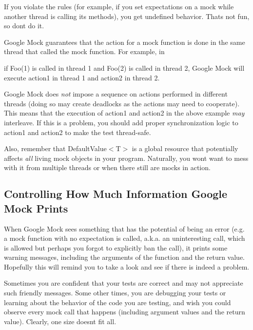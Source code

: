 If you violate the rules (for example, if you set expectations on a mock while another thread is calling its methods), you get undefined behavior. That\textquotesingle{}s not fun, so don\textquotesingle{}t do it.

Google Mock guarantees that the action for a mock function is done in the same thread that called the mock function. For example, in


\begin{DoxyCode}{0}
\end{DoxyCode}


if {\ttfamily Foo(1)} is called in thread 1 and {\ttfamily Foo(2)} is called in thread 2, Google Mock will execute {\ttfamily action1} in thread 1 and {\ttfamily action2} in thread 2.

Google Mock does {\itshape not} impose a sequence on actions performed in different threads (doing so may create deadlocks as the actions may need to cooperate). This means that the execution of {\ttfamily action1} and {\ttfamily action2} in the above example {\itshape may} interleave. If this is a problem, you should add proper synchronization logic to {\ttfamily action1} and {\ttfamily action2} to make the test thread-\/safe.

Also, remember that {\ttfamily Default\+Value$<$T$>$} is a global resource that potentially affects {\itshape all} living mock objects in your program. Naturally, you won\textquotesingle{}t want to mess with it from multiple threads or when there still are mocks in action.

\subsection*{Controlling How Much Information Google Mock Prints}

When Google Mock sees something that has the potential of being an error (e.\+g. a mock function with no expectation is called, a.\+k.\+a. an uninteresting call, which is allowed but perhaps you forgot to explicitly ban the call), it prints some warning messages, including the arguments of the function and the return value. Hopefully this will remind you to take a look and see if there is indeed a problem.

Sometimes you are confident that your tests are correct and may not appreciate such friendly messages. Some other times, you are debugging your tests or learning about the behavior of the code you are testing, and wish you could observe every mock call that happens (including argument values and the return value). Clearly, one size doesn\textquotesingle{}t fit all.

